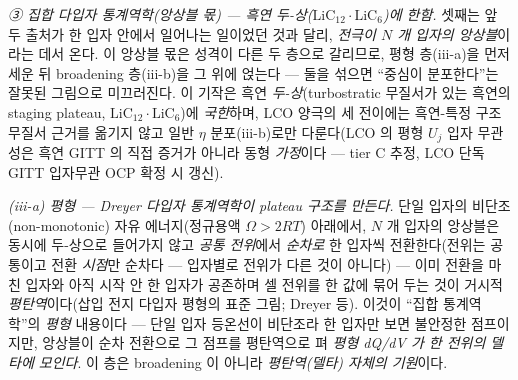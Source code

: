 \documentclass[11pt,a4paper]{article}
\begin{document}
\emph{③ 집합 다입자 통계역학(앙상블 몫) — 흑연 두-상($\mathrm{LiC_{12}}\cdot\mathrm{LiC_6}$)에 한함.} 셋째는 앞 두 출처가
한 입자 안에서 일어나는 일이었던 것과 달리, \emph{전극이 $N$ 개 입자의 앙상블}이라는 데서 온다. 이 앙상블 몫은 성격이
다른 두 층으로 갈리므로, 평형 층(iii-a)을 먼저 세운 뒤 broadening 층(iii-b)을 그 위에 얹는다 — 둘을 섞으면 ``중심이
분포한다''는 잘못된 그림으로 미끄러진다. 이 기작은 흑연 \emph{두-상}(turbostratic 무질서가 있는 흑연의 staging
plateau, $\mathrm{LiC_{12}}\cdot\mathrm{LiC_6}$)에 \emph{국한}하며, LCO 양극의 세 전이에는 흑연-특정 구조 무질서
근거를 옮기지 않고 일반 $\eta$ 분포(iii-b)로만 다룬다(LCO 의 평형 $U_j$ 입자 무관성은 흑연 GITT\cite{park2021} 의
직접 증거가 아니라 동형 \emph{가정}이다 — tier C 추정, LCO 단독 GITT 입자무관 OCP 확정 시 갱신).

\emph{(iii-a) 평형 — Dreyer 다입자 통계역학이 \emph{plateau 구조}를 만든다.} 단일 입자의 비단조(non-monotonic) 자유
에너지(정규용액 $\Omega>2RT$) 아래에서, $N$ 개 입자의 앙상블은 동시에 두-상으로 들어가지 않고 \emph{공통 전위}에서
\emph{순차로} 한 입자씩 전환한다(전위는 공통이고 전환 \emph{시점}만 순차다 — 입자별로 전위가 다른 것이 아니다) —
이미 전환을 마친 입자와 아직 시작 안 한 입자가 공존하며 셀 전위를 한 값에 묶어 두는
것이 거시적 \emph{평탄역}이다(삽입 전지 다입자 평형의 표준 그림; Dreyer 등\cite{dreyer2010}). 이것이 ``집합 통계역학''의
\emph{평형} 내용이다 — 단일 입자 등온선이 비단조라 한 입자만 보면 불안정한 점프이지만, 앙상블이 순차 전환으로 그 점프를
평탄역으로 펴 \emph{평형 dQ/dV 가 한 전위의 델타에 모인다}. 이 층은 broadening 이 아니라 \emph{평탄역(델타) 자체의 기원}이다.
\end{document}
